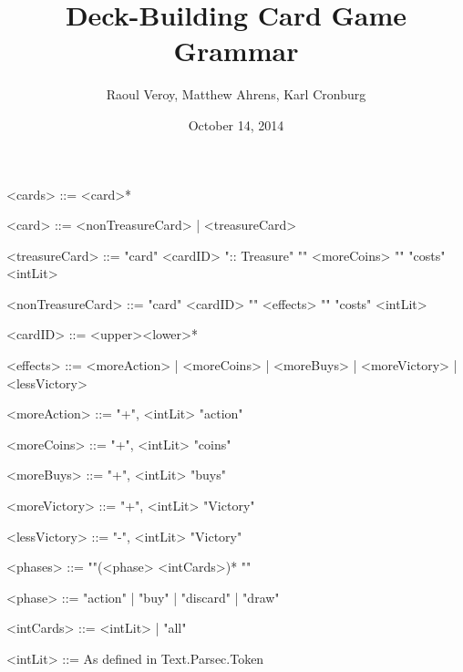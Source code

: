 \documentclass{article}
\title{Deck-Building Card Game Grammar}
\author{Raoul Veroy, Matthew Ahrens, Karl Cronburg}
\date{October 14, 2014}
\begin{document}
\maketitle
\thispagestyle{empty}

\begin{grammar}
<cards> ::= <card>*

<card>        ::= <nonTreasureCard> | <treasureCard>

<treasureCard> ::= "card" <cardID> ":: Treasure" "{" <moreCoins> "}" "costs" <intLit>

<nonTreasureCard> ::= "card" <cardID> "{" <effects> "}" "costs" <intLit>

<cardID>      ::= <upper><lower>*

<effects>     ::= <moreAction> | <moreCoins> | <moreBuys> | <moreVictory>  | <lessVictory>

<moreAction>  ::= "+", <intLit> "action"  

<moreCoins>   ::= "+", <intLit> "coins"  

<moreBuys>    ::= "+", <intLit> "buys"  

<moreVictory> ::= "+", <intLit> "Victory"  

<lessVictory> ::= "-", <intLit> "Victory"  

<phases> ::= "{"(<phase> <intCards>)* "}"

<phase> ::= "action" | "buy" | "discard" | "draw"

<intCards> ::= <intLit> | "all"

<intLit>      ::= As defined in Text.Parsec.Token

%
% 
% 
% 
\end{grammar}
\end{document}
